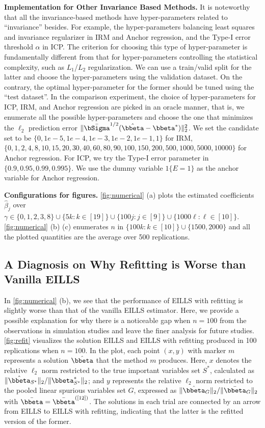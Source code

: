 \documentclass[10pt]{article}
\numberwithin{equation}{section}
\begin{document}
\noindent \textbf{Implementation for Other Invariance Based Methods.} It is noteworthy that all the invariance-based methods have hyper-parameters related to ``invariance'' besides. For example, the hyper-parameters balancing least squares and invariance regularizer in IRM and Anchor regression, and the Type-I error threshold $\alpha$ in ICP. The criterion for choosing this type of hyper-parameter is fundamentally different from that for hyper-parameters controlling the statistical complexity, such as $L_1$/$L_2$ regularization. We can use a train/valid split for the latter and choose the hyper-parameters using the validation dataset. On the contrary, the optimal hyper-parameter for the former should be tuned using the ``test dataset''. In the comparison experiment, the choice of hyper-parameters for ICP, IRM, and Anchor regression are picked in an oracle manner, that is, we enumerate all the possible hyper-parameters and choose the one that minimizes the $\ell_2$ prediction error $\|\bar{\bSigma}^{1/2}(\hat{\bbeta} - \bbeta^*)\|_2^2$. We set the candidate set to be $\{0,1e-5,1e-4,1e-3,1e-2,1e-1,1\}$ for IRM, $\{0, 1, 2, 4, 8, 10, 15, 20, 30, 40, 60, 80, 90, 100, 150, 200, 500, 1000, 5000, 10000\}$ for Anchor regression. For ICP, we try the Type-I error parameter in $\{0.9, 0.95, 0.99, 0.995\}$. We use the dummy variable $1\{E=1\}$ as the anchor variable for Anchor regression.

\noindent \textbf{Configurations for figures.} \cref{fig:numerical} (a) plots the estimated coefficients $\hat{\beta}_j$ over $\gamma \in \{0, 1, 2, 3, 8\} \cup \{5k: k\in [19]\} \cup \{100j:j\in [9]\} \cup \{1000\ell: \ell\in [10]\}$. \cref{fig:numerical} (b) (c) enumerates $n$ in $\{100k: k\in [10]\} \cup \{1500, 2000\}$ and all the plotted quantities are the average over 500 replications.

\subsection{A Diagnosis on Why Refitting is Worse than Vanilla EILLS} 
\label{sec:diagnosis}

In \cref{fig:numerical} (b), we see that the performance of EILLS with refitting is slightly worse than that of the vanilla EILLS estimator. Here, we provide a possible explanation for why there is a noticeable gap when $n=100$ from the observations in simulation studies and leave the finer analysis for future studies. \cref{fig:refit} visualizes the solution EILLS and EILLS with refitting produced in 100 replications when $n=100$. In the plot, each point $(x, y)$ with marker $m$ represents a solution $\hat{\bbeta}$ that the method $m$ produces. Here, $x$ denotes the relative $\ell_2$ norm restricted to the true important variables set $S^*$, calculated as $\|\hat{\bbeta}_{S^*}\|_2/\|{\bbeta}^*_{S^*}\|_2$; and $y$ represents the relative $\ell_2$ norm restricted to the pooled linear spurious variables set $G$, expressed as $\|\hat{\bbeta}_{G}\|_2/\|\bar{\bbeta}_{G}\|_2$ with $\bar{\bbeta} = \bar{\bbeta}^{([12])}$.  The solutions in each trial are connected by an arrow from EILLS to EILLS with refitting, indicating that the latter is the refitted version of the former. 
\end{document}
